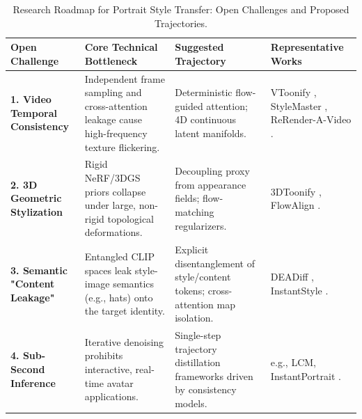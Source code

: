 \documentclass[journal]{IEEEtran}
\begin{document}
\begin{table}[t]
\centering
\caption{Research Roadmap for Portrait Style Transfer: Open Challenges and Proposed Trajectories.}
\label{tab:research_roadmap}
\begin{tabularx}{\textwidth}{l>{\raggedright\arraybackslash}X>{\raggedright\arraybackslash}X>{\raggedright\arraybackslash}X}
\toprule
\textbf{Open Challenge} & \textbf{Core Technical Bottleneck} & \textbf{Suggested Trajectory} & \textbf{Representative Works} \\
\midrule
\textbf{1. Video Temporal Consistency} & Independent frame sampling and cross-attention leakage cause high-frequency texture flickering. & Deterministic flow-guided attention; 4D continuous latent manifolds. & VToonify \cite{yang2022vtoonify}, StyleMaster \cite{ye2024stylemastersy}, ReRender-A-Video \cite{yang2023rerender}. \\
\textbf{2. 3D Geometric Stylization} & Rigid NeRF/3DGS priors collapse under large, non-rigid topological deformations. & Decoupling proxy from appearance fields; flow-matching regularizers. & 3DToonify \cite{threedtoonify2024}, FlowAlign \cite{flowalign2025}. \\
\textbf{3. Semantic "Content Leakage"} & Entangled CLIP spaces leak style-image semantics (e.g., hats) onto the target identity. & Explicit disentanglement of style/content tokens; cross-attention map isolation. & DEADiff \cite{qi2024deadiff}, InstantStyle \cite{wang2024instantstyle}. \\
\textbf{4. Sub-Second Inference} & Iterative denoising prohibits interactive, real-time avatar applications. & Single-step trajectory distillation frameworks driven by consistency models. & e.g., LCM, InstantPortrait \cite{lai2025instantportraitop}. \\
\bottomrule
\end{tabularx}
\end{table}
\end{document}
